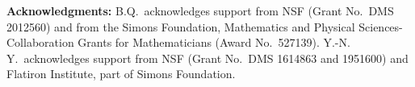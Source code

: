 \documentclass[lineno]{jfm}
\begin{document}
\begin{acknowledgments}
  {\bf Acknowledgments:} B.Q.~acknowledges support from NSF (Grant
  No.~DMS 2012560) and from the Simons Foundation, Mathematics and
  Physical Sciences-Collaboration Grants for Mathematicians (Award
  No.~527139). Y.-N. Y.~acknowledges support from NSF (Grant No.~DMS 1614863 and 1951600) and
  Flatiron Institute, part of Simons Foundation.
\end{acknowledgments}

%







%
%


%
\end{document}
